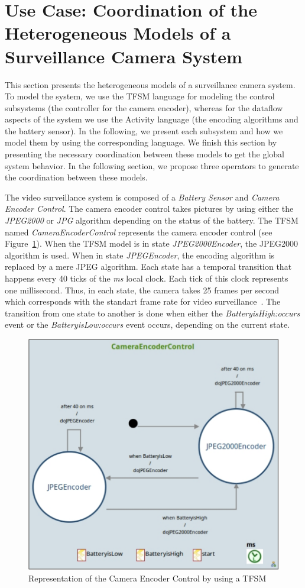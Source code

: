 \section{Use Case: Coordination of the Heterogeneous Models of a Surveillance Camera System}
This section presents the heterogeneous models of a surveillance camera system. To model the system, we use the TFSM language for modeling the control subsystems (\ie the controller for the camera encoder), whereas for the dataflow aspects of the system we use the Activity language (\ie the encoding algorithms and the battery sensor). In the following, we present each subsystem and how we model them by using the corresponding language. We finish this section by presenting the necessary coordination between these models to get the global system behavior. In the following section, we propose three operators to generate the coordination between these models. 

The video surveillance system is composed of a \emph{Battery Sensor} and \emph{Camera Encoder Control}. The camera encoder control takes pictures by using either the \emph{JPEG2000} or \emph{JPG} algorithm depending on the status of the battery. The TFSM named \emph{CameraEncoderControl} represents the camera encoder control (see Figure~\ref{fig:cameramodelencoder}). When the TFSM model is in state \emph{JPEG2000Encoder}, the JPEG2000 algorithm is used. When in state \emph{JPEGEncoder}, the encoding algorithm is replaced by a mere JPEG algorithm. Each state has a temporal transition that happens every 40 ticks of the \emph{ms} local clock. Each tick of this clock represents one millisecond. Thus, in each state, the camera takes 25 frames per second which corresponds with the standart frame rate for video surveillance~\cite{?}. The transition from one state to another is done when either the \emph{BatteryisHigh:occurs} event or the \emph{BatteryisLow:occurs} event occurs, depending on the current state.	
	
		\begin{figure}[h]
			\center
			\includegraphics[width=.6\columnwidth]{examples/figs/cameraencodercontrol.pdf}
			\caption{Representation of the Camera Encoder Control by using a TFSM}
			\label{fig:cameramodelencoder}
		\end{figure}
		

